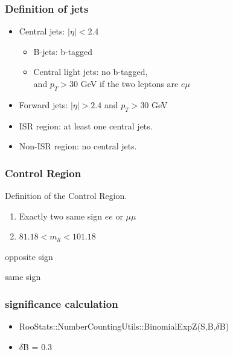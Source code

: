 \documentclass[mathserif,serif]{beamer}
\begin{document}
\begin{frame}
\frametitle{Definition of jets}
\normalsize
\begin{itemize}
\item Central jets: $|\eta|<2.4$
\begin{itemize}
\item B-jets: b-tagged
\item Central light jets: no b-tagged,\\
and $p_T>30$ GeV if the two leptons are $e\mu$
\end{itemize}
\item Forward jets: $|\eta|>2.4$ and $p_T>30$ GeV
\item ISR region: at least one central jets.
\item Non-ISR region: no central jets.
\end{itemize}
\end{frame}

\begin{frame}
\frametitle{Control Region}
Definition of the Control Region.
\begin{enumerate}
\item Exactly two same sign $ee$ or $\mu\mu$
\item $81.18 < m_{ll} < 101.18$
\end{enumerate}
\end{frame}

\begin{frame}
\begin{center}
\huge
opposite sign
\end{center}
\end{frame}


%

\begin{frame}
\begin{center}
\huge
same sign
\end{center}
\end{frame}


%

\begin{frame}
\frametitle{significance calculation}
\begin{itemize}
\item RooStats::NumberCountingUtils::BinomialExpZ(S,B,$\delta$B)
\item $\delta$B = 0.3
\end{itemize}
\end{frame}
\end{document}
